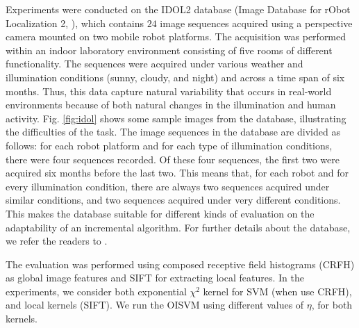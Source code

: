 Experiments were conducted on the IDOL2 database
(Image Database for rObot Localization 2, \cite{luo:idol2}), which
contains $24$ image sequences acquired using a perspective camera
mounted on two mobile robot platforms. The acquisition was performed
within an indoor laboratory environment consisting of five rooms of
different functionality. The sequences were acquired under various
weather and illumination conditions (sunny, cloudy, and night) and
across a time span of six months. Thus, this data capture natural
variability that occurs in real-world environments because of both
natural changes in the illumination and human activity.
Fig. \ref{fig:idol} shows some sample images from the database,
illustrating the difficulties of the task.  The image sequences in the
database are divided as follows: for each robot platform and for each
type of illumination conditions, there were four sequences
recorded. Of these four sequences, the first two were acquired six
months before the last two. This means that, for each robot and for
every illumination condition, there are always two sequences acquired
under similar conditions, and two sequences acquired under very
different conditions. This makes the database suitable for different
kinds of evaluation on the adaptability of an incremental
algorithm. For further details about the database, we refer the
readers to \cite{luo:idol2}.

The evaluation was performed using composed receptive field histograms
(CRFH) \cite{linde:icpr04} as global image features and SIFT
\cite{lowe99object} for extracting local features. In the experiments,
we consider both exponential $\chi^2$ kernel for SVM (when use CRFH),
and local kernels \cite{wallraven:iccv03} (SIFT). We run the OISVM
using different values of $\eta$, for both kernels.

